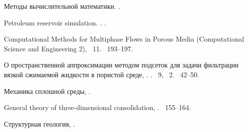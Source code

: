 \documentclass[11pt,twoside]{article}
\begin{document}
{\begin{thebibliography}{1}
 Методы вычислительной математики. 
.

 Petroleum reservoir simulation.
  .
.

Computational Methods for Multiphase Flows in Porous Media (Computational Science and Engineering 2),
~11.
~193--197.

 О пространственной аппроксимации
  методом подсеток для задачи фильтрации вязкой сжимаемой жидкости в пористой
  среде, .
.
~9, {\cyr\textnumero}~2.
~42--50.

 Механика сплошной среды, 
.

 General theory of three-dimensional consolidation,
.
~155--164.

 Структурная геология,
.

\end{thebibliography}
}
\end{document}
